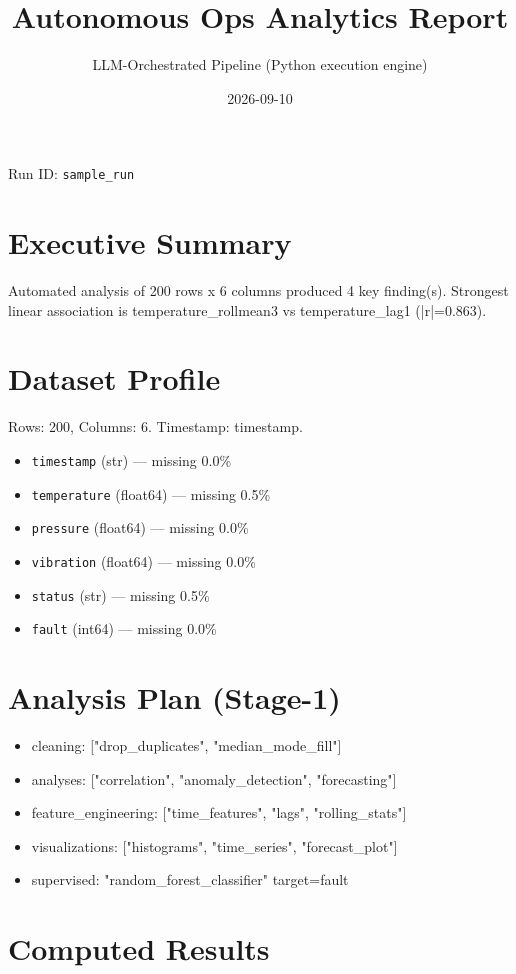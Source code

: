 \documentclass[11pt,a4paper]{article}
\title{Autonomous Ops Analytics Report}
\author{LLM-Orchestrated Pipeline (Python execution engine)}
\date{2026-09-10}
\begin{document}
\maketitle
Run ID: \texttt{sample\_run} \\
\section{Executive Summary}
Automated analysis of 200 rows x 6 columns produced 4 key finding(s). Strongest linear association is temperature\_rollmean3 vs temperature\_lag1 (|r|=0.863).
\section{Dataset Profile}
Rows: 200, Columns: 6. Timestamp: timestamp.\\
\begin{itemize}
\item \texttt{timestamp} (str) --- missing 0.0\% 
\item \texttt{temperature} (float64) --- missing 0.5\% 
\item \texttt{pressure} (float64) --- missing 0.0\% 
\item \texttt{vibration} (float64) --- missing 0.0\% 
\item \texttt{status} (str) --- missing 0.5\% 
\item \texttt{fault} (int64) --- missing 0.0\% 
\end{itemize}
\section{Analysis Plan (Stage-1)}
\begin{itemize}
\item cleaning: ["drop\_duplicates", "median\_mode\_fill"] 
\item analyses: ["correlation", "anomaly\_detection", "forecasting"] 
\item feature\_engineering: ["time\_features", "lags", "rolling\_stats"] 
\item visualizations: ["histograms", "time\_series", "forecast\_plot"] 
\item supervised: "random\_forest\_classifier" target=fault 
\end{itemize}
\section{Computed Results}
\end{document}
